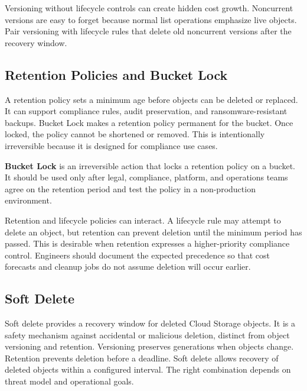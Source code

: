 \begin{pitfall}
Versioning without lifecycle controls can create hidden cost growth. Noncurrent versions are easy to forget because normal list operations emphasize live objects. Pair versioning with lifecycle rules that delete old noncurrent versions after the recovery window.
\end{pitfall}

\subsection{Retention Policies and Bucket Lock}
A retention policy sets a minimum age before objects can be deleted or replaced. It can support compliance rules, audit preservation, and ransomware-resistant backups. Bucket Lock makes a retention policy permanent for the bucket. Once locked, the policy cannot be shortened or removed. This is intentionally irreversible because it is designed for compliance use cases.

\begin{definitionbox}
\textbf{Bucket Lock} is an irreversible action that locks a retention policy on a bucket. It should be used only after legal, compliance, platform, and operations teams agree on the retention period and test the policy in a non-production environment.
\end{definitionbox}

Retention and lifecycle policies can interact. A lifecycle rule may attempt to delete an object, but retention can prevent deletion until the minimum period has passed. This is desirable when retention expresses a higher-priority compliance control. Engineers should document the expected precedence so that cost forecasts and cleanup jobs do not assume deletion will occur earlier.

\subsection{Soft Delete}
Soft delete provides a recovery window for deleted Cloud Storage objects. It is a safety mechanism against accidental or malicious deletion, distinct from object versioning and retention. Versioning preserves generations when objects change. Retention prevents deletion before a deadline. Soft delete allows recovery of deleted objects within a configured interval. The right combination depends on threat model and operational goals.

